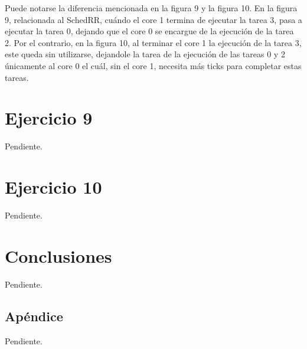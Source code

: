 \documentclass[a4paper,10pt,twoside]{article}
\begin{document}
Puede notarse la diferencia mencionada en la figura 9 y la figura 10. En la figura 9, relacionada al SchedRR, cuándo el core 1 termina de ejecutar la tarea 3, pasa a ejecutar la tarea 0, dejando que el core 0 se encargue de la ejecución de la tarea 2. Por el contrario, en la figura 10, al terminar el core 1 la ejecución de la tarea 3, este queda sin utilizarse, dejandole la tarea de la ejecución de las tareas 0 y 2 únicamente al core 0 el cuál, sin el core 1, necesita más ticks para completar estas tareas.



\section{Ejercicio 9}

Pendiente.




\section{Ejercicio 10}

Pendiente.




\section{Conclusiones}

Pendiente.



\newpage

\begin{appendices}

\section{Apéndice}

Pendiente.


\end{appendices}
\end{document}
